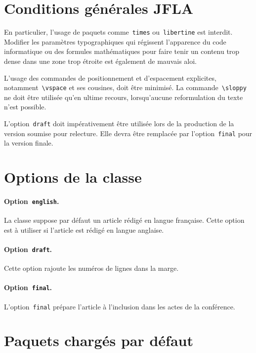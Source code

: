 \documentclass[draft]{jflart}
\newcommand{\cmd}[1]{\texttt{\textbackslash {#1}}}
\begin{document}
\section{Conditions générales JFLA}
%
En particulier, l'usage de paquets comme~\texttt{times}
ou~\texttt{libertine} est interdit.
%
Modifier les paramètres typographiques qui régissent l'apparence du code
informatique ou des formules mathématiques pour faire tenir un contenu trop
dense dans une zone trop étroite est également de mauvais aloi.

L'usage des commandes de positionnement et d'espacement explicites,
notamment~\cmd{vspace} et ses cousines, doit être minimisé.
%
La commande~\cmd{sloppy} ne doit être utilisée qu'en ultime recours,
lorsqu'aucune reformulation du texte n'est possible.

L'option~\texttt{draft} doit impérativement être utilisée lors de la production
de la version soumise pour relecture.
%
Elle devra être remplacée par l'option~\texttt{final} pour la version finale.

\section{Options de la classe}

\paragraph{Option~\texttt{english}.}

La classe suppose par défaut un article rédigé en langue française.
%
Cette option est à utiliser si l'article est rédigé en langue anglaise.

\paragraph{Option~\texttt{draft}.}

Cette option rajoute les numéros de lignes dans la marge.

\paragraph{Option~\texttt{final}.}

L'option~\texttt{final} prépare l'article à l'inclusion dans les actes de la
conférence.

\section{Paquets chargés par défaut}
\end{document}
